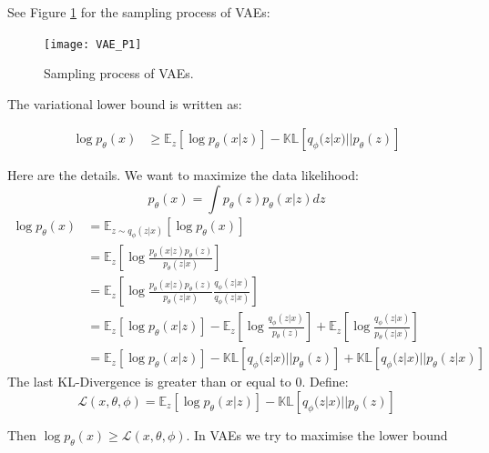 \documentclass[english]{article}
\begin{document}
See Figure \ref{svae} for the sampling process of VAEs:
\begin{figure}[H]\centering
\texttt{[image: VAE\_P1]}
\caption{Sampling process of VAEs.}
   \label{svae}
\end{figure}




The variational lower bound is written as:

\begin{align*}
	\log p_{\theta}(x) %
	&\geq\mathbb{E}_{z}[\log p_{\theta}(x|z)] - \mathbb{KL}[q_{\phi}(z|x)||p_{\theta}(z)]
\end{align*}





\item 

Here are the details. We want to maximize the data likelihood:
\begin{equation*}
	p_{\theta}(x) = \int p_{\theta}(z)p_{\theta}(x|z)dz
\end{equation*}
\begin{align*}
	\log p_{\theta}(x) &= \mathbb{E}_{z\sim q_{\phi}(z|x)}[\log p_{\theta}(x)]\\
	&=\mathbb{E}_{z}[\log\frac{p_{\theta}(x|z)p_{\theta}(z)}{p_{\theta}(z|x)}]\\
	&=\mathbb{E}_{z}[\log\frac{p_{\theta}(x|z)p_{\theta}(z)}{p_{\theta}(z|x)}\frac{q_{\phi}(z|x)}{q_{\phi}(z|x)}]\\
	&=\mathbb{E}_{z}[\log p_{\theta}(x|z)] - \mathbb{E}_{z}[\log\frac{q_{\phi}(z|x)}{p_{\theta}(z)}] + \mathbb{E}_{z}[\log\frac{q_{\phi}(z|x)}{p_{\theta}(z|x)}]\\
	&=\mathbb{E}_{z}[\log p_{\theta}(x|z)] - \mathbb{KL}[q_{\phi}(z|x)||p_{\theta}(z)] + \mathbb{KL}[q_{\phi}(z|x)||p_{\theta}(z|x)]
\end{align*}
The last KL-Divergence is greater than or equal to 0. Define:
\begin{equation*}
	\mathcal{L}(x, \theta, \phi) = \mathbb{E}_{z}[\log p_{\theta}(x|z)] - \mathbb{KL}[q_{\phi}(z|x)||p_{\theta}(z)]
\end{equation*}

Then $\log p_{\theta}(x) \geq \mathcal{L}(x, \theta, \phi)$. 
In VAEs we try to maximise the lower bound
\end{document}
